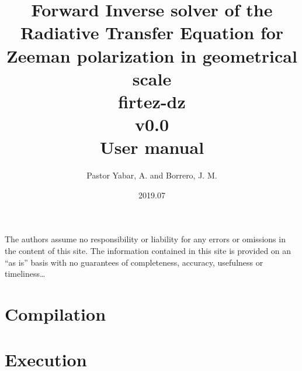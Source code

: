 \documentclass[12pt,a4]{article}
\begin{document}
\title{Forward Inverse solver of the Radiative Transfer Equation for Zeeman polarization in geometrical scale\\firtez-dz\\v0.0\\User manual}
\author{Pastor Yabar, A. and Borrero, J. M.}
\date{2019.07}
\maketitle

\clearpage
\tableofcontents
%
\clearpage
\vspace*{\fill}
\noindent The authors assume no responsibility or liability for any errors or omissions in the content of this site. The information contained in this site is provided on an ``as is'' basis with no guarantees of completeness, accuracy, usefulness or timeliness\ldots
%
\clearpage
\section{Compilation}

%
\clearpage
\section{Execution}

\end{document}
